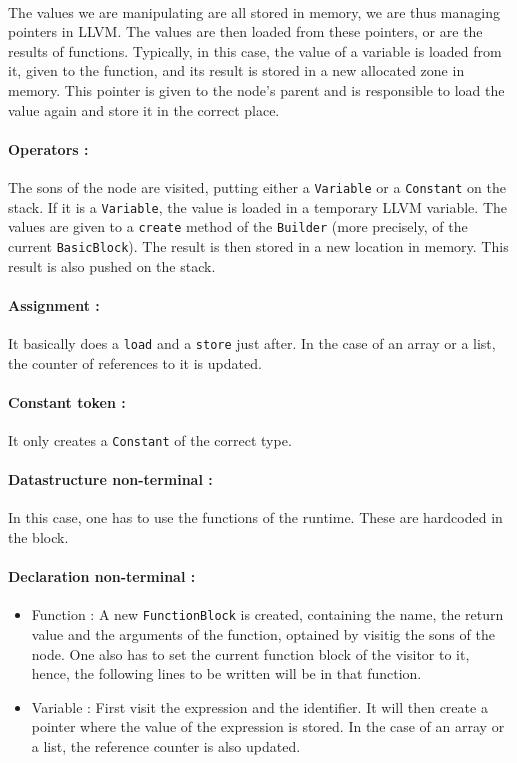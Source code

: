 \documentclass[a4paper,11pt]{article}
\begin{document}
\paragraph{}

The values we are manipulating are all stored in memory, we are thus managing pointers in LLVM. The values are then loaded from these pointers, or are the results of functions. Typically, in this case, the value of a variable is loaded from it, given to the function, and its result is stored in a new allocated zone in memory. This pointer is given to the node's parent and is responsible to load the value again and store it in the correct place.

\paragraph{Operators :} The sons of the node are visited, putting either a \texttt{Variable} or a \texttt{Constant} on the stack. If it is a \texttt{Variable}, the value is loaded in a temporary LLVM variable. The values are given to a \texttt{create} method of the \texttt{Builder} (more precisely, of the current \texttt{BasicBlock}). The result is then stored in a new location in memory. This result is also pushed on the stack.

\paragraph{Assignment :} It basically does a \texttt{load} and a \texttt{store} just after. In the case of an array or a list, the counter of references to it is updated.

\paragraph{Constant token :} It only creates a \texttt{Constant} of the correct type.

\paragraph{Datastructure non-terminal :} In this case, one has to use the functions of the runtime. These are hardcoded in the block.

\paragraph{Declaration non-terminal :} 
\begin{itemize}
	\item Function : A new \texttt{FunctionBlock} is created, containing the name, the return value and the arguments of the function, optained by visitig the sons of the node. One also has to set the current function block of the visitor to it, hence, the following lines to be written will be in that function.
	\item Variable : First visit the expression and the identifier. It will then create a pointer where the value of the expression is stored. In the case of an array or a list, the reference counter is also updated.
\end{itemize}
\end{document}

